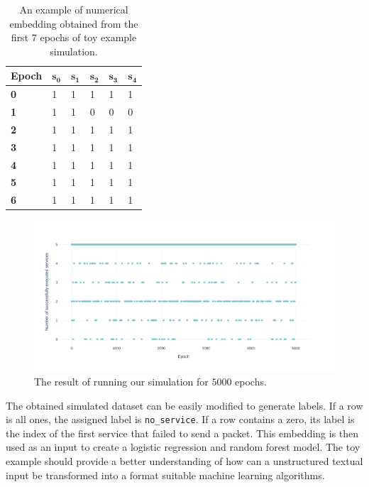 \begin{table}[!h]
\centering
\begin{tabular}{@{}p{1.5cm}p{1.5cm}p{1.5cm}p{1.5cm}p{1.5cm}p{1.5cm}@{}}
\toprule
Epoch      & $\mathbf{s_0}$ & $\mathbf{s_1}$ & $\mathbf{s_2}$ & $\mathbf{s_3}$ & $\mathbf{s_4}$ \\ \toprule
\textbf{0} & 1             & 1             & 1             & 1             & 1             \\
\textbf{1} & 1             & 1             & 0             & 0             & 0             \\
\textbf{2} & 1             & 1             & 1             & 1             & 1             \\
\textbf{3} & 1             & 1             & 1             & 1             & 1             \\
\textbf{4}          & 1             & 1             & 1             & 1             & 1             \\
\textbf{5}          & 1             & 1             & 1             & 1             & 1             \\
\textbf{6}          & 1             & 1             & 1             & 1             & 1             \\ \bottomrule
\end{tabular}
\caption{An example of numerical embedding obtained from the first $7$ epochs of toy example simulation.}\label{tab:simulation}
\end{table}

\begin{figure}[!h]
        \centerline{\includegraphics[scale=.5]{img/dummy_data_plot.pdf}}
        \caption{The result of running our simulation for $5000$ epochs.}
        \label{fig:simulationPlot}
\end{figure}

The obtained simulated dataset can be easily modified to generate labels. If a row is all ones, the assigned label is \texttt{no\_service}. If a row contains a zero, its label is the index of the first service that failed to send a packet. This embedding is then used as an input to create a logistic regression and random forest model. The toy example should provide a better understanding of how can a unstructured textual input be transformed into a format suitable machine learning algorithms.

